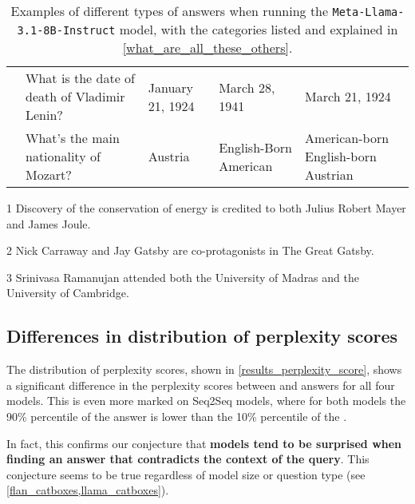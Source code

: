 \begin{table}[p]
\begin{threeparttable}
\begin{tabularx}{\textwidth}{>{\bfseries}c>{\ttfamily}X >{\ttfamily}p{75pt} >{\ttfamily}p{75pt} >{\ttfamily}p{75pt}}
			\multirow[t]{2}{*}{7.} & What is the date of death of Vladimir Lenin? & January 21, 1924 & March 28, 1941 & March 21, 1924 \\
				& What's the main nationality of Mozart? & Austria & English-Born American & American-born English-born Austrian \\
			\bottomrule
		\end{tabularx}
		\begin{tablenotes}
\item[1] Discovery of the conservation of energy is credited to both Julius Robert Mayer and James Joule.
\item[2] Nick Carraway and Jay Gatsby are co-protagonists in The Great Gatsby.
\item[3] Srinivasa Ramanujan attended both the University of Madras and the University of Cambridge.
		\end{tablenotes}
	\end{threeparttable}
	\caption{Examples of different types of \Other{} answers when running the \texttt{Meta-Llama-3.1-8B-Instruct} model, with the categories listed and explained in \cref{what_are_all_these_others}.}
	\label{other_examples}
\end{table}

\subsection{Differences in distribution of perplexity scores}
\label{discussion_perplexity_scores}

The distribution of perplexity scores, shown in \cref{results_perplexity_score}, shows a significant difference in the perplexity scores between \Parametric{} and \Contextual{} answers for all four models.
This is even more marked on Seq2Seq models, where for both models the 90\% percentile of the \Contextual{} answer is lower than the 10\% percentile of the \Parametric{}.

In fact, this confirms our conjecture that \textbf{models tend to be surprised when finding an answer that contradicts the context of the query}.
This conjecture seems to be true regardless of model size or question type (see \cref{flan_catboxes,llama_catboxes}).

